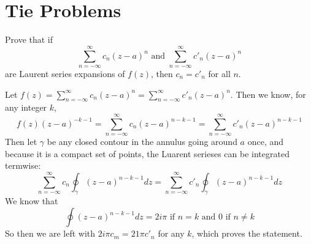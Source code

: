 \documentclass[12pt]{article}
\begin{document}
\section*{Tie Problems}

\begin{statement}
  Prove that if 
  $$ \sum^{\infty}_{n=-\infty} c_n(z-a)^n \text{ and } \sum^{\infty}_{n=-\infty} c'_n(z-a)^n $$
  are Laurent series expansions of $f(z)$, then $c_n=c'_n$ for all $n$.
\end{statement}
\begin{newproof}
  Let $f(z)=\sum^{\infty}_{n=-\infty} c_n(z-a)^n=\sum^{\infty}_{n=-\infty} c'_n(z-a)^n$. Then we know, for any integer $k$,  
  \begin{equation*}
    f(z)(z-a)^{-k-1}=\sum^{\infty}_{n=-\infty} c_n(z-a)^{n-k-1}=\sum^{\infty}_{n=-\infty} c'_n(z-a)^{n-k-1}
  \end{equation*}
  Then let $\gamma$ be any closed contour in the annulus going around $a$ once, and because it is a compact set 
  of points, the Luarent serieses can be integrated termwise:
  \begin{equation*}
    \sum^{\infty}_{n=-\infty}c_n \oint_{\gamma} (z-a)^{n-k-1}dz=\sum^{\infty}_{n=-\infty}c'_n \oint_{\gamma} (z-a)^{n-k-1}dz
  \end{equation*}
  We know that 
  \begin{equation*}
    \oint(z-a)^{n-k-1}dz = 2i\pi \text{ if } n=k \text{ and } 0 \text{ if } n \neq k
  \end{equation*}
  So then we are left with $2i\pi c_m = 21\pi c'_n$ for any $k$, which proves the statement.
\end{newproof}
\end{document}
